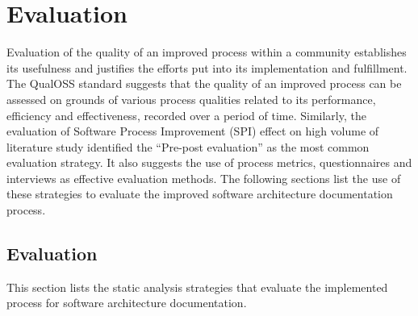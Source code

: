 \chapter{Evaluation}\label{chapter:Evaluation}
\indent Evaluation of the quality of an improved process within a community establishes its usefulness and justifies the efforts put into its implementation and fulfillment.
\\\indent The QualOSS standard \cite{Shahin2014} suggests that the quality of an improved process can be assessed on grounds of various process qualities related to its performance, efficiency and effectiveness, recorded over a period of time. Similarly, the evaluation of Software Process Improvement (SPI) \cite{Unterkalmsteiner2011} effect on high volume of literature study identified the \enquote{Pre-post evaluation} as the most common evaluation strategy.  It also suggests the use of process metrics, questionnaires and interviews as effective evaluation methods. The following sections list the use of these strategies to evaluate the improved software architecture documentation process.
\section{Evaluation}
This section lists the static analysis strategies that evaluate the implemented process for software architecture documentation.

